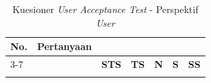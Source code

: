 \begin{longtable}{|p{0.8cm}|p{7.5cm}|>{\centering\arraybackslash}p{0.8cm}|>{\centering\arraybackslash}p{0.8cm}|>{\centering\arraybackslash}p{0.8cm}|>{\centering\arraybackslash}p{0.8cm}|>{\centering\arraybackslash}p{0.8cm}|}
    \caption{Kuesioner \textit{User Acceptance Test} - Perspektif \textit{User}} \label{tabel:uat_user}                                                                                                                                               \\
    \hline
    \multirow{2}{*}{\textbf{No.}}              & \multirow{2}{*}{\textbf{Pertanyaan}}                                                                   & \multicolumn{5}{c|}{\textbf{Jawaban}}                                                       \\ \cline{3-7}
                                               &                                                                                                        & \textbf{STS}                          & \textbf{TS} & \textbf{N} & \textbf{S} & \textbf{SS} \\
    \hline
    \endfirsthead



    \hline %
    \endlastfoot


\end{longtable}
